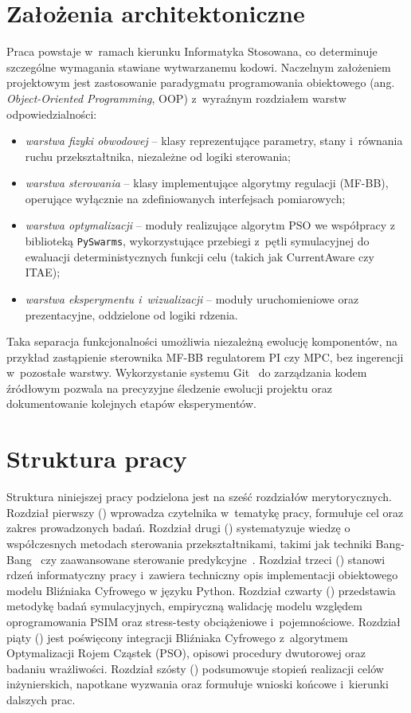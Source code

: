 \section{Założenia architektoniczne}
\label{sec:zalozenia}

Praca powstaje w~ramach kierunku Informatyka Stosowana, co determinuje szczególne wymagania stawiane wytwarzanemu kodowi. Naczelnym założeniem projektowym jest zastosowanie paradygmatu programowania obiektowego (ang. \emph{Object-Oriented Programming}, OOP) z~wyraźnym rozdziałem warstw odpowiedzialności:

\begin{itemize}
	\item \emph{warstwa fizyki obwodowej} -- klasy reprezentujące parametry, stany i~równania ruchu przekształtnika, niezależne od logiki sterowania;
	\item \emph{warstwa sterowania} -- klasy implementujące algorytmy regulacji (MF-BB), operujące wyłącznie na zdefiniowanych interfejsach pomiarowych;
	\item \emph{warstwa optymalizacji} -- moduły realizujące algorytm PSO we współpracy z biblioteką \texttt{PySwarms}, wykorzystujące przebiegi z~pętli symulacyjnej do ewaluacji deterministycznych funkcji celu (takich jak CurrentAware czy ITAE);
	\item \emph{warstwa eksperymentu i~wizualizacji} -- moduły uruchomieniowe oraz prezentacyjne, oddzielone od logiki rdzenia.
\end{itemize}

Taka separacja funkcjonalności umożliwia niezależną ewolucję komponentów, na przykład zastąpienie sterownika MF-BB regulatorem PI czy MPC, bez ingerencji w~pozostałe warstwy. Wykorzystanie systemu Git~\cite{chacon2014progit} do zarządzania kodem źródłowym pozwala na precyzyjne śledzenie ewolucji projektu oraz dokumentowanie kolejnych etapów eksperymentów.

\section{Struktura pracy}
\label{sec:struktura}

Struktura niniejszej pracy podzielona jest na sześć rozdziałów merytorycznych. Rozdział pierwszy () wprowadza czytelnika w~tematykę pracy, formułuje cel oraz zakres prowadzonych badań. Rozdział drugi () systematyzuje wiedzę o współczesnych metodach sterowania przekształtnikami, takimi jak techniki Bang-Bang~\cite{tatari2024mfbb} czy zaawansowane sterowanie predykcyjne~\cite{tatari2025splitcost}. Rozdział trzeci () stanowi rdzeń informatyczny pracy i~zawiera techniczny opis implementacji obiektowego modelu Bliźniaka Cyfrowego w języku Python. Rozdział czwarty () przedstawia metodykę badań symulacyjnych, empiryczną walidację modelu względem oprogramowania PSIM oraz stress-testy obciążeniowe i~pojemnościowe. Rozdział piąty () jest poświęcony integracji Bliźniaka Cyfrowego z~algorytmem Optymalizacji Rojem Cząstek (PSO), opisowi procedury dwutorowej oraz badaniu wrażliwości. Rozdział szósty () podsumowuje stopień realizacji celów inżynierskich, napotkane wyzwania oraz formułuje wnioski końcowe i~kierunki dalszych prac.
